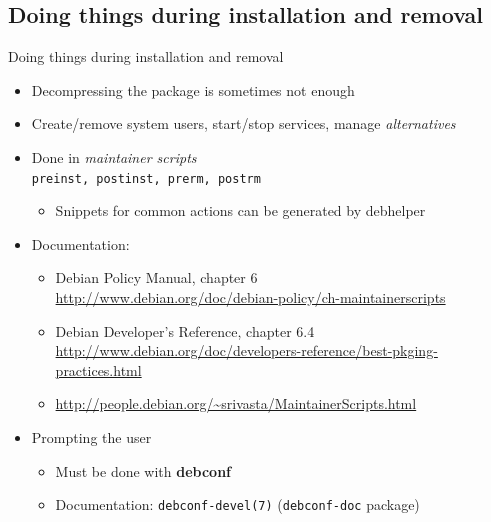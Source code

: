 \documentclass[10pt,final]{beamer}
\begin{document}
\subsection{Doing things during installation and removal}
\begin{frame}{Doing things during installation and removal}
  \begin{itemize}
  \item Decompressing the package is sometimes not enough
    \hbr
  \item Create/remove system users, start/stop services, manage \textsl{alternatives}
    \hbr
  \item Done in \textsl{maintainer scripts}\\
    \texttt{preinst, postinst, prerm, postrm}
    \begin{itemize}
	    \item  Snippets for common actions can be generated by debhelper
    \end{itemize}
    \hbr
  \item Documentation:
    \begin{itemize}
    \item Debian Policy Manual, chapter 6\\
      {\footnotesize \url{http://www.debian.org/doc/debian-policy/ch-maintainerscripts}}
      
      \hbr
    \item Debian Developer's Reference, chapter 6.4\\
      {\scriptsize \url{http://www.debian.org/doc/developers-reference/best-pkging-practices.html}}
      \hbr
    \item {\footnotesize \url{http://people.debian.org/~srivasta/MaintainerScripts.html}}
    \end{itemize}
    \br
  \item Prompting the user
    \begin{itemize}
    \item Must be done with \textbf{debconf}
      \hbr
    \item Documentation: \texttt{debconf-devel(7)} (\texttt{debconf-doc} package)
    \end{itemize}
  \end{itemize}
\end{frame}
\end{document}
